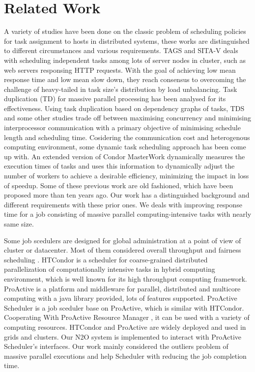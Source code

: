 \section{Related Work}

A variety of studies have been done on the classic problem of scheduling policies for task assignment to hosts in distributed systems, these works are distinguished to different circumstances and various requirements. TAGS \cite{_task_2002} and SITA-V \cite{crovella_task_1998} deals with scheduling independent tasks among lots of server nodes in cluster, such as web servers responsing HTTP requests. With the goal of achieving low mean response time and low mean slow down, they reach consensus to overcoming the challenge of heavy-tailed in task size's distribution by load unbalancing. Task duplication (TD) \cite{manoharan_effect_2001} for massive parallel processing has been analysed for its effectiveness. Using task duplication based on dependency graphs of tasks, TDS \cite{ranaweera_task_2000} and some other studies \cite{ahmad_exploiting_1998} \cite{dogan_ldbs:_2002} trade off between maximising concurrency and minimising interprocessor communication with a primary objective of minimising schedule length and scheduling time. Cosidering the communication cost and heterogenous computing environment, some dynamic task \cite{ahmad_semi-distributed_1991} \cite{ucar_task_2006} scheduling approach has been come up with. An extended version of Condor MasterWork \cite{heymann_adaptive_2000} dynamically measures the execution times of tasks and uses this information to dynamically adjust the number of workers to achieve a desirable efficiency, minimizing the impact in loss of speedup. Some of these previous work are old fashioned, which have been proposed more than ten years ago. Our work has a distinguished background and different requirements with these prior ones. We deals with improving response time for a job consisting of massive parallel computing-intensive tasks with nearly same size.

Some job scedulers are designed for global administration at a point of view of cluster or datacenter. Most of them considered overall throughput and fairness scheduling \cite{isard_quincy:_2009}. HTCondor\cite{_htcondor_????} is a scheduler for coarse-grained distributed parallelization of computationally intensive tasks in hybrid computing environment, which is well known for its high throughput computing framework. ProActive \cite{_proactive_????} is a platform and middleware for parallel, distributed and multicore computing with a java library provided, lots of features supported. ProActive Scheduler \cite{_proactive_????-2} is a job sceduler base on ProActive, which is similar with HTCondor. Cooperating With ProActive Resource Manager \cite{_proactive_????-1}, it can be used with a variety of computing resources. HTCondor and ProActive are widely deployed and used in grids and clusters. Our N2O system is implemented to interact with ProActive Scheduler's interfaces. Our work mainly considered the outliers problem of massive parallel executions and help Scheduler with reducing the job completion time.

